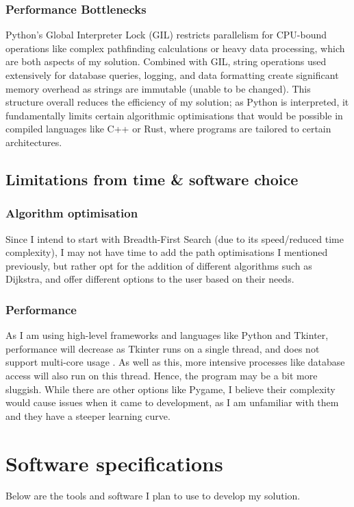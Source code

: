 \subsubsection{Performance Bottlenecks}
Python's Global Interpreter Lock (GIL) \cite{ajitsaria_python_gil} restricts parallelism for CPU-bound operations like complex pathfinding calculations or heavy data processing, which are both aspects of my solution. Combined with GIL, string operations used extensively for database queries, logging, and data formatting create significant memory overhead as strings are immutable (unable to be changed)\cite{dev_python_strings}. This structure overall reduces the efficiency of my solution; as Python is interpreted, it fundamentally limits certain algorithmic optimisations that would be possible in compiled languages like C++ or Rust, where programs are tailored to certain architectures.

\subsection{Limitations from time \& software choice}

\subsubsection{Algorithm optimisation}

Since I intend to start with Breadth-First Search (due to its speed/reduced time complexity), I may not have time to add the path optimisations I mentioned previously, but rather opt for the addition of different algorithms such as Dijkstra, and offer different options to the user based on their needs.

\subsubsection{Performance}

As I am using high-level frameworks and languages like Python and Tkinter, performance will decrease as Tkinter runs on a single thread, and does not support multi-core usage \cite{python_tkinter}. As well as this, more intensive processes like database access will also run on this thread. Hence, the program may be a bit more sluggish. While there are other options like Pygame, I believe their complexity would cause issues when it came to development, as I am unfamiliar with them and they have a steeper learning curve.


\section{Software specifications}
Below are the tools and software I plan to use to develop my solution.

